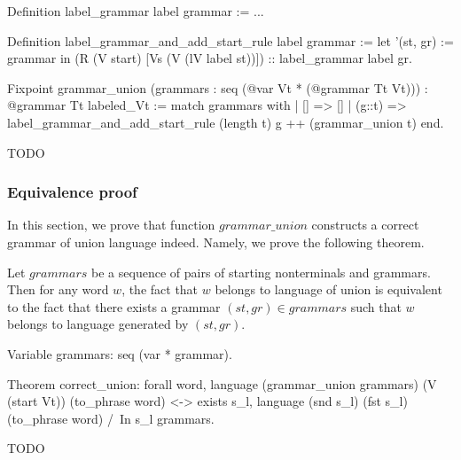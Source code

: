 \begin{listing}[h]
    \begin{pyglist}[language=coq, numbers=none, numbersep=5pt]
  Definition label_grammar label grammar := ...

  Definition label_grammar_and_add_start_rule 
               label 
               grammar :=
    let '(st, gr) := grammar in 
    (R (V start) [Vs (V (lV label st))]) 
       :: label_grammar label gr.        

  Fixpoint grammar_union 
     (grammars : seq (@var Vt * (@grammar Tt Vt)))
       : @grammar 
     Tt 
     labeled_Vt :=
    match grammars with
    |  [] => []
    |  (g::t) => 
         label_grammar_and_add_start_rule 
           (length t) 
           g ++ (grammar_union t)
    end.
    \end{pyglist}
    \caption{TODO}
    \label{lst:verbments1}
\end{listing}

\subsubsection{Equivalence proof}

In this section, we prove that function $grammar\_union$ constructs a correct grammar of union language indeed. Namely, we prove the following theorem.

\begin{theorem}\label{theorem-correct-union}
    Let $grammars$ be a sequence of pairs of starting nonterminals and grammars. Then for any word $w$, the fact that $w$ belongs to language of union is equivalent to the fact that there exists a grammar $(st,gr) \in grammars$ such that $w$ belongs to language generated by $(st,gr)$.
\end{theorem}

\begin{listing}[h]
    \begin{pyglist}[language=coq, numbers=none, numbersep=5pt]
  Variable grammars: seq (var * grammar).

  Theorem correct_union:
    forall word, 
      language (grammar_union grammars) 
        (V (start Vt)) (to_phrase word) <->
      exists s_l, 
        language (snd s_l) (fst s_l) 
          (to_phrase word) /\ 
        In s_l grammars.
    \end{pyglist}
    \caption{TODO}
    \label{lst:verbments1}
\end{listing}



